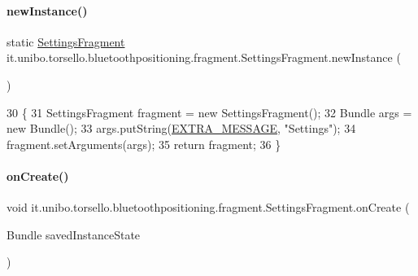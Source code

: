 \paragraph{\texorpdfstring{new\+Instance()}{newInstance()}}
{\footnotesize\ttfamily static \hyperlink{classit_1_1unibo_1_1torsello_1_1bluetoothpositioning_1_1fragment_1_1SettingsFragment}{Settings\+Fragment} it.\+unibo.\+torsello.\+bluetoothpositioning.\+fragment.\+Settings\+Fragment.\+new\+Instance (\begin{DoxyParamCaption}{ }\end{DoxyParamCaption})\hspace{0.3cm}{\ttfamily [static]}}


\begin{DoxyCode}
30                                                  \{
31         SettingsFragment fragment = \textcolor{keyword}{new} SettingsFragment();
32         Bundle args = \textcolor{keyword}{new} Bundle();
33         args.putString(\hyperlink{classit_1_1unibo_1_1torsello_1_1bluetoothpositioning_1_1fragment_1_1SettingsFragment_a3f3c627008cd1e176afc52642c73fd93_a3f3c627008cd1e176afc52642c73fd93}{EXTRA\_MESSAGE}, \textcolor{stringliteral}{"Settings"});
34         fragment.setArguments(args);
35         \textcolor{keywordflow}{return} fragment;
36     \}
\end{DoxyCode}
\hypertarget{classit_1_1unibo_1_1torsello_1_1bluetoothpositioning_1_1fragment_1_1SettingsFragment_a7de90efb25e655078f5f8984f7c6d628_a7de90efb25e655078f5f8984f7c6d628}{}\label{classit_1_1unibo_1_1torsello_1_1bluetoothpositioning_1_1fragment_1_1SettingsFragment_a7de90efb25e655078f5f8984f7c6d628_a7de90efb25e655078f5f8984f7c6d628} 
\paragraph{\texorpdfstring{on\+Create()}{onCreate()}}
{\footnotesize\ttfamily void it.\+unibo.\+torsello.\+bluetoothpositioning.\+fragment.\+Settings\+Fragment.\+on\+Create (\begin{DoxyParamCaption}\item[{Bundle}]{saved\+Instance\+State }\end{DoxyParamCaption})}


